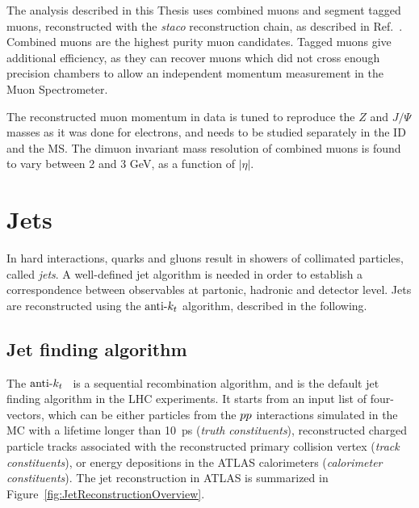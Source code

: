 The analysis described in this Thesis uses combined muons and segment tagged muons, reconstructed with the \textit{staco} reconstruction chain, as described in Ref.~\cite{Hassani:2007cy}.
Combined muons are the highest purity muon candidates.
Tagged muons give additional efficiency, as they can recover muons which did not cross enough precision chambers to allow an independent momentum measurement in the Muon Spectrometer.

The reconstructed muon momentum in data is tuned to reproduce the $Z$ and $J/\Psi$ masses as it was done for electrons, and needs to be studied separately in the ID and the MS.
The dimuon invariant mass resolution of combined muons is found to vary between 2 and 3 GeV, as a function of $|\eta|$. 


\section{Jets}
    \label{sec:JetReco}

In hard interactions, quarks and gluons result in showers of collimated particles, called \textit{jets}.
A well-defined jet algorithm is needed in order to establish a correspondence between observables at partonic, hadronic and detector level.
Jets are reconstructed using the $\hbox{anti-${k_t}$}$ algorithm, described in the following.


\subsection{Jet finding algorithm}
    \label{subsec:JetClusteringAlgorithm}


The $\hbox{anti-${k_t}$}$~\cite{Cacciari:2008gp} is a sequential recombination algorithm, and is the default jet finding algorithm in the LHC experiments.
It starts from an input list of four-vectors, which can be either particles from the $pp$ interactions simulated in the MC with a lifetime longer than 10~ps (\emph{truth constituents}), reconstructed charged particle tracks associated with the reconstructed primary collision vertex (\emph{track constituents}), or energy depositions in the ATLAS calorimeters (\emph{calorimeter constituents}).
The jet reconstruction in ATLAS is summarized in Figure~\ref{fig:JetReconstructionOverview}.

